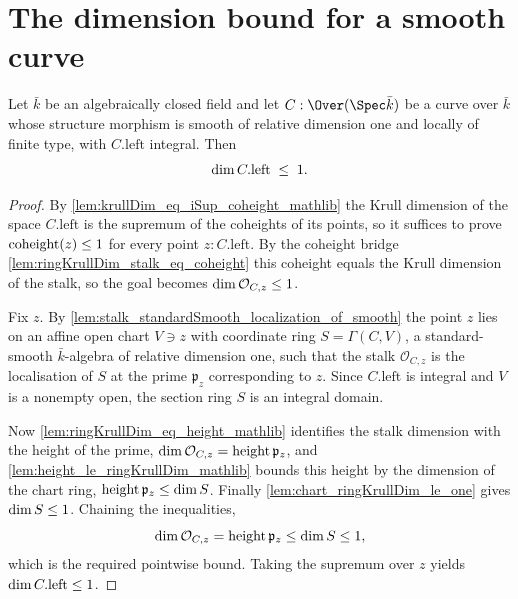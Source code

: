 \section{The dimension bound for a smooth curve}

\begin{theorem}
  \label{thm:krullDim_curve_le_one}
  Let \(\bar k\) be an algebraically closed field and let \(C : \Over(\Spec \bar k)\)
  be a curve over \(\bar k\) whose structure morphism is smooth of relative dimension
  one and locally of finite type, with \(C.\mathrm{left}\) integral.  Then
  \[
    \dim C.\mathrm{left} \;\le\; 1 .
  \]
\end{theorem}

\begin{proof}
        \leanok
  By \cref{lem:krullDim_eq_iSup_coheight_mathlib} the Krull dimension of the space
  \(C.\mathrm{left}\) is the supremum of the coheights of its points, so it suffices to
  prove \(\operatorname{coheight}(z) \le 1\) for every point \(z : C.\mathrm{left}\).  By the
  coheight bridge \cref{lem:ringKrullDim_stalk_eq_coheight} this coheight equals the
  Krull dimension of the stalk, so the goal becomes \(\dim \mathcal O_{C,z} \le
  1\).

  Fix \(z\).  By
  \cref{lem:stalk_standardSmooth_localization_of_smooth} the point \(z\) lies on an
  affine open chart \(V \ni z\) with coordinate ring \(S = \Gamma(C, V)\), a
  standard-smooth \(\bar k\)-algebra of relative dimension one, such that the stalk
  \(\mathcal O_{C,z}\) is the localisation of \(S\) at the prime \(\mathfrak p_z\)
  corresponding to \(z\).  Since \(C.\mathrm{left}\) is integral and \(V\) is a
  nonempty open, the section ring \(S\) is an integral domain.

  Now \cref{lem:ringKrullDim_eq_height_mathlib} identifies the stalk dimension with the
  height of the prime, \(\dim \mathcal O_{C,z} = \operatorname{height} \mathfrak p_z\), and
  \cref{lem:height_le_ringKrullDim_mathlib} bounds this height by the dimension of the
  chart ring, \(\operatorname{height} \mathfrak p_z \le \dim S\).  Finally
  \cref{lem:chart_ringKrullDim_le_one} gives \(\dim S \le 1\).  Chaining the
  inequalities,
  \[
    \dim \mathcal O_{C,z}
      = \operatorname{height} \mathfrak p_z
      \le \dim S
      \le 1 ,
  \]
  which is the required pointwise bound.  Taking the supremum over \(z\) yields
  \(\dim C.\mathrm{left} \le 1\).
\end{proof}
